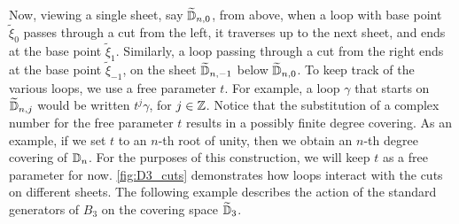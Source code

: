 Now, viewing a single sheet, say $\widetilde{\mathbb{D}}_{n,0}$, from above, when a loop with base point $\tilde{\xi}_0$ passes through a cut from the left, it traverses up to the next sheet, and ends at the base point $\tilde{\xi}_1$. Similarly, a loop passing through a cut from the right ends at the base point $\tilde{\xi}_{-1}$, on the sheet $\widetilde{\mathbb{D}}_{n,-1}$ below $\widetilde{\mathbb{D}}_{n,0}$. To keep track of the various loops, we use a free parameter $t$. For example, a loop $\gamma$ that starts on $\widetilde{\mathbb{D}}_{n,j}$ would be written $t^j \gamma$, for $j\in\mathbb{Z}$. Notice that the substitution of a complex number for the free parameter $t$ results in a possibly finite degree covering. As an example, if we set $t$ to an $n$-th root of unity, then we obtain an $n$-th degree covering of $\mathbb{D}_n$. For the purposes of this construction, we will keep $t$ as a free parameter for now.{ }\cref{fig:D3_cuts} demonstrates how loops interact with the cuts on different sheets. The following example describes the action of the standard generators of $B_3$ on the covering space $\widetilde{\mathbb{D}}_3$.

